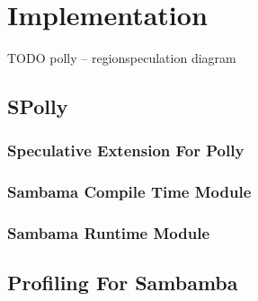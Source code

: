 
\chapter{Implementation} %
\label{Chapter3}

\begin{center}
  TODO polly -- regionspeculation diagram
\end{center}


\section{SPolly} 

\subsection{Speculative Extension For Polly}

\subsection{Sambama Compile Time Module}

\subsection{Sambama Runtime Module}

\section{Profiling For Sambamba}
